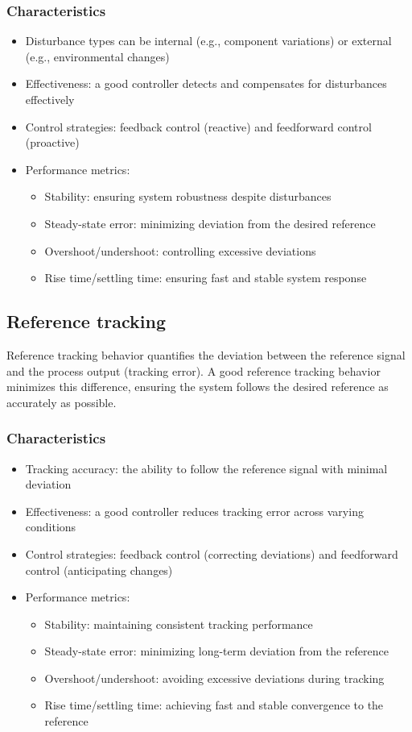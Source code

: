 \documentclass{article}
\begin{document}
\subsubsection{Characteristics}
\begin{itemize}
    \item Disturbance types can be internal (e.g., component variations) or external (e.g., environmental changes)
    \item Effectiveness: a good controller detects and compensates for disturbances effectively
    \item Control strategies: feedback control (reactive) and feedforward control (proactive)
    \item Performance metrics:
    \begin{itemize}
        \item Stability: ensuring system robustness despite disturbances
        \item Steady-state error: minimizing deviation from the desired reference
        \item Overshoot/undershoot: controlling excessive deviations
        \item Rise time/settling time: ensuring fast and stable system response
    \end{itemize}
\end{itemize}

\subsection{Reference tracking}
Reference tracking behavior quantifies the deviation between the reference signal and the process
output (tracking error). A good reference tracking behavior minimizes this difference, ensuring the system follows
the desired reference as accurately as possible.

\subsubsection{Characteristics}
\begin{itemize}
    \item Tracking accuracy: the ability to follow the reference signal with minimal deviation
    \item Effectiveness: a good controller reduces tracking error across varying conditions
    \item Control strategies: feedback control (correcting deviations) and feedforward control (anticipating changes)
    \item Performance metrics:
    \begin{itemize}
        \item Stability: maintaining consistent tracking performance
        \item Steady-state error: minimizing long-term deviation from the reference
        \item Overshoot/undershoot: avoiding excessive deviations during tracking
        \item Rise time/settling time: achieving fast and stable convergence to the reference
    \end{itemize}
\end{itemize}
\end{document}

